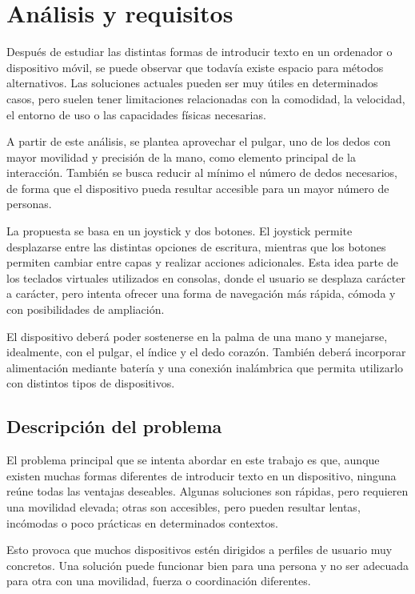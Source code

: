 \chapter{Análisis y requisitos}
\label{ch:requisitos}

Después de estudiar las distintas formas de introducir texto en un ordenador o dispositivo móvil, se puede observar que todavía existe espacio para métodos alternativos. Las soluciones actuales pueden ser muy útiles en determinados casos, pero suelen tener limitaciones relacionadas con la comodidad, la velocidad, el entorno de uso o las capacidades físicas necesarias.

A partir de este análisis, se plantea aprovechar el pulgar, uno de los dedos con mayor movilidad y precisión de la mano, como elemento principal de la interacción. También se busca reducir al mínimo el número de dedos necesarios, de forma que el dispositivo pueda resultar accesible para un mayor número de personas.

La propuesta se basa en un joystick y dos botones. El joystick permite desplazarse entre las distintas opciones de escritura, mientras que los botones permiten cambiar entre capas y realizar acciones adicionales. Esta idea parte de los teclados virtuales utilizados en consolas, donde el usuario se desplaza carácter a carácter, pero intenta ofrecer una forma de navegación más rápida, cómoda y con posibilidades de ampliación.

El dispositivo deberá poder sostenerse en la palma de una mano y manejarse, idealmente, con el pulgar, el índice y el dedo corazón. También deberá incorporar alimentación mediante batería y una conexión inalámbrica que permita utilizarlo con distintos tipos de dispositivos.

\section{Descripción del problema}
\label{sec:descripcion-problema}

El problema principal que se intenta abordar en este trabajo es que, aunque existen muchas formas diferentes de introducir texto en un dispositivo, ninguna reúne todas las ventajas deseables. Algunas soluciones son rápidas, pero requieren una movilidad elevada; otras son accesibles, pero pueden resultar lentas, incómodas o poco prácticas en determinados contextos.

Esto provoca que muchos dispositivos estén dirigidos a perfiles de usuario muy concretos. Una solución puede funcionar bien para una persona y no ser adecuada para otra con una movilidad, fuerza o coordinación diferentes.

